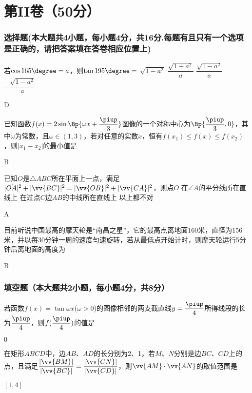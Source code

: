 \part{第II卷（50分）}
\vspace{-1.5em}
\section{选择题(本大题共4小题，每小题4分，共16分.每题有且只有一个选项是正确的，请把答案填在答卷相应位置上)}
  \item
    若$\cos{165\degree}=a$，则$\tan{195\degree}=$\xz
      \xx
       {$\sqrt{1-a^2}$}
       {$\dfrac{\sqrt{1+a^2}}a$}
       {$\dfrac{\sqrt{1-a^2}}a$}
       {$-\dfrac{\sqrt{1-a^2}}a$}
    \begin{answer}
      D
    \end{answer}
  \item
    已知函数$f(x)=2\sin\Bp{\omega x+\dfrac{\piup}3}$图像的一个对称中心为$\Bp{\dfrac{\piup}3,0}$，其中$\omega$为常数，且$\omega\in(1,3)$，若对任意的实数$x$，恒有$f(x_1)\leq f(x)\leq f(x_2)$，则$|x_1-x_2|$的最小值是\xz
    \begin{answer}
      B
    \end{answer}
  \item
    已知$O$是$\triangle{ABC}$所在平面上一点，满足$|\vec{OA}|^2+|\vv{BC}|^2=|\vv{OB}|^2+|\vv{CA}|^2$，则点$O$\xz
       {在$\angle{A}$的平分线所在直线上}
       {在过点$C$边$AB$的中线所在直线上}
       {以上都不对}
    \begin{answer}
      A
    \end{answer}
  \item
    目前听说中国最高的摩天轮是“南昌之星”，它的最高点离地面160米，直径为156米，并以每30分钟一周的速度匀速旋转，若从最低点开始计时，则摩天轮运行5分钟后离地面的高度为\xz
    \begin{answer}
      B
    \end{answer}
\section{填空题（本大题共2小题，每小题4分，共8分）}
  \item
    若函数$f(x)=\tan{\omega x}$($\omega>0$)的图像相邻的两支截直线$y=\dfrac{\piup}4$所得线段的长为$\dfrac{\piup}4$，则$f(\dfrac{\piup}4)$的值是\tk
    \begin{answer}
      $0$
    \end{answer}
  \item
    在矩形$ABCD$中，边$AB$、$AD$的长分别为2、1，若$M$、$N$分别是边$BC$、$CD$上的点，且满足$\dfrac{|\vv{BM}|}{|\vv{BC}|}=\dfrac{|\vv{CN}|}{|\vv{CD}|}$，则$\vv{AM}\cdot\vv{AN}$的取值范围是\tk
    \begin{answer}
      $[1,4]$
    \end{answer}
\newpage

